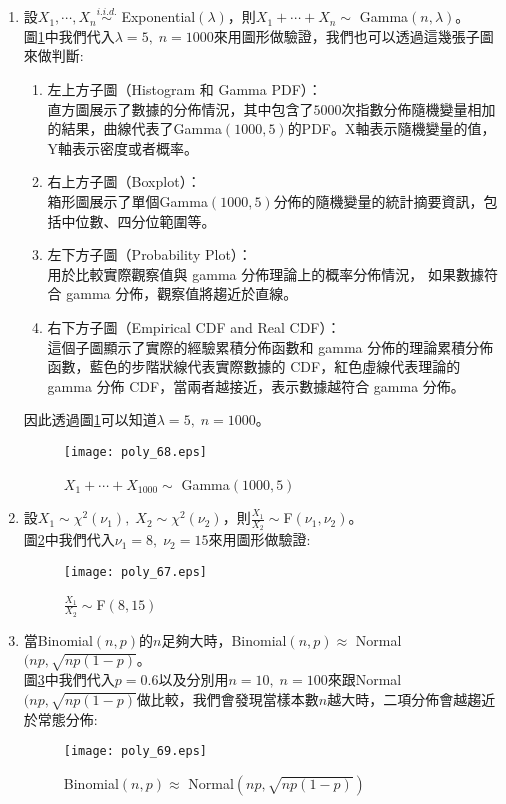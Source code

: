 \documentclass[12pt, a4paper]{article}
\begin{document}
\begin{enumerate}
\item 設\;$X_1,\cdots,X_n \overset{i.i.d.}{\sim}$ Exponential$(\lambda)$\;，則\;$X_1+\cdots+X_n \sim$ Gamma$(n, \lambda)$\;。\\
圖\;\ref{fig:poly_68.eps}\;中我們代入\;$\lambda =5,\;n=1000$\;來用圖形做驗證，我們也可以透過這幾張子圖來做判斷\;:
\begin{enumerate}
\item 左上方子圖（Histogram 和 Gamma PDF）：\\
直方圖展示了數據的分佈情況，其中包含了\;$5000$\;次指數分佈隨機變量相加的結果，曲線代表了Gamma$(1000, 5)$的PDF。X軸表示隨機變量的值，Y軸表示密度或者概率。
\item 右上方子圖（Boxplot）：\\
箱形圖展示了單個Gamma$(1000, 5)$分佈的隨機變量的統計摘要資訊，包括中位數、四分位範圍等。
\item 左下方子圖（Probability Plot）：\\
用於比較實際觀察值與 gamma 分佈理論上的概率分佈情況，
如果數據符合 gamma 分佈，觀察值將趨近於直線。
\item 右下方子圖（Empirical CDF and Real CDF）：\\
這個子圖顯示了實際的經驗累積分佈函數和 gamma 分佈的理論累積分佈函數，藍色的步階狀線代表實際數據的 CDF，紅色虛線代表理論的 gamma 分佈 CDF，當兩者越接近，表示數據越符合 gamma 分佈。
\end{enumerate}

因此透過圖\;\ref{fig:poly_68.eps}\;可以知道\;$\lambda =5,\;n=1000$\;。

\begin{figure}[H]
\centering
\texttt{[image: poly\_68.eps]}
\caption{$X_1+\cdots+X_{1000} \sim$ Gamma$(1000, 5)$}
\label{fig:poly_68.eps}
\end{figure} 

\item 設\;$X_1 \sim \chi^2(\nu_1),\;X_2 \sim \chi^2(\nu_2)$\;，則\;$\frac{X_1}{X_2} \sim$F$(\nu_1,\nu_2)$\;。\\
圖\;\ref{fig:poly_67.eps}\;中我們代入\;$\nu_1=8,\;\nu_2=15$\;來用圖形做驗證\;:

\begin{figure}[H]
\centering
\texttt{[image: poly\_67.eps]}
\caption{$\frac{X_1}{X_2} \sim $F$(8,15)$}
\label{fig:poly_67.eps}
\end{figure}

\item 當\;Binomial$(n,p)$\;的\;$n$\;足夠大時，\;Binomial$(n,p)\approx$ Normal$(np,\sqrt{np(1-p)}$\;。\\
圖\;\ref{fig:poly_69.eps}\;中我們代入\;$p=0.6$\;以及分別用\;$n=10,\;n=100$\;來跟\;Normal$(np,\sqrt{np(1-p)}$\;做比較\;，我們會發現當樣本數\;$n$\;越大時，二項分佈會越趨近於常態分佈:

\begin{figure}[H]
\centering
\texttt{[image: poly\_69.eps]}
\caption{Binomial$(n,p)\approx$ Normal$(np,\sqrt{np(1-p)})$}
\label{fig:poly_69.eps}
\end{figure}

\end{enumerate}
\end{document}

